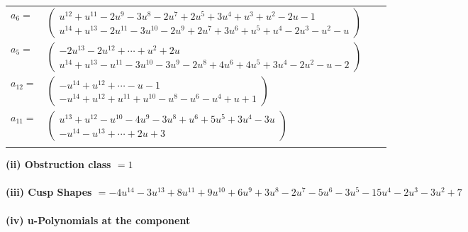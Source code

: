 \documentclass[1p]{elsarticle_modified}
\theoremstyle{definition}
\begin{document}
\begin{tabular}{m{7pt} m{180pt} m{7pt} m{180pt} }
\flushright $a_{6}=$&$\begin{pmatrix}u^{12}+u^{11}-2 u^9-3 u^8-2 u^7+2 u^5+3 u^4+u^3+u^2-2 u-1\\u^{14}+u^{13}-2 u^{11}-3 u^{10}-2 u^9+2 u^7+3 u^6+u^5+u^4-2 u^3- u^2- u\end{pmatrix}$ \\
\flushright $a_{5}=$&$\begin{pmatrix}-2 u^{13}-2 u^{12}+\cdots+u^2+2 u\\u^{14}+u^{13}- u^{11}-3 u^{10}-3 u^9-2 u^8+4 u^6+4 u^5+3 u^4-2 u^2- u-2\end{pmatrix}$ \\
\flushright $a_{12}=$&$\begin{pmatrix}- u^{14}+u^{12}+\cdots- u-1\\- u^{14}+u^{12}+u^{11}+u^{10}- u^8- u^6- u^4+u+1\end{pmatrix}$ \\
\flushright $a_{11}=$&$\begin{pmatrix}u^{13}+u^{12}- u^{10}-4 u^9-3 u^8+u^6+5 u^5+3 u^4-3 u\\- u^{14}- u^{13}+\cdots+2 u+3\end{pmatrix}$\\&\end{tabular}
\flushleft \textbf{(ii) Obstruction class $= 1$}\\~\\
\flushleft \textbf{(iii) Cusp Shapes $= -4 u^{14}-3 u^{13}+8 u^{11}+9 u^{10}+6 u^9+3 u^8-2 u^7-5 u^6-3 u^5-15 u^4-2 u^3-3 u^2+7$}\\~\\
\newpage\renewcommand{\arraystretch}{1}
\flushleft \textbf{(iv) u-Polynomials at the component}\newline \\
\end{document}
